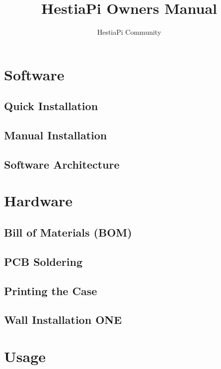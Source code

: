 \documentclass{article}
\begin{document}
\title{HestiaPi Owners Manual}
\author{HestiaPi Community}
\maketitle

\tableofcontents
\newpage

\section{Software}
\subsection{Quick Installation}


\subsection{Manual Installation}


\subsection{Software Architecture} \label{Software Architecture}



\section{Hardware}
\subsection{Bill of Materials (BOM)}


\subsection{PCB Soldering}


\subsection{Printing the Case}


\subsection{Wall Installation ONE} \label{Wall Installation ONE}



\section{Usage}
\end{document}
